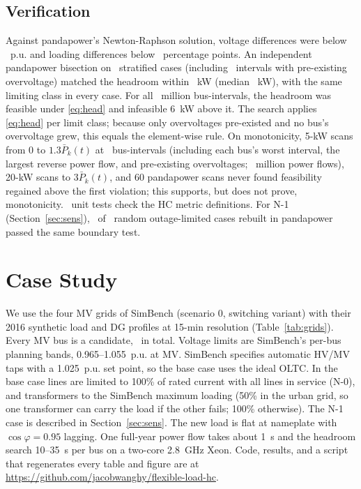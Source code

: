 \documentclass[conference,letterpaper]{IEEEtran}
\begin{document}
\subsection{Verification}\label{sec:val}
Against pandapower's Newton-Raphson solution, voltage differences were below \maxdV~p.u. and loading differences below \maxdL~percentage points. An independent pandapower bisection on \audValN~stratified cases (including \audValOvt~intervals with pre-existing overvoltage) matched the headroom within \audValMax~kW (median \audValMed~kW), with the same limiting class in every case. For all \audBoundaryM~million bus-intervals, the headroom was feasible under \eqref{eq:head} and infeasible 6~kW above it. The search applies \eqref{eq:head} per limit class; because only overvoltages pre-existed and no bus's overvoltage grew, this equals the element-wise rule. On monotonicity, 5-kW scans from 0 to $1.3\bar P_k(t)$ at \fsCases~bus-intervals (including each bus's worst interval, the largest reverse power flow, and pre-existing overvoltages; \fsSteps~million power flows), 20-kW scans to $3\bar P_k(t)$, and 60 pandapower scans never found feasibility regained above the first violation; this supports, but does not prove, monotonicity. \audTestsN~unit tests check the HC metric definitions. For N-1 (Section~\ref{sec:sens}), \nOnePPOK~of \nOnePPN~random outage-limited cases rebuilt in pandapower passed the same boundary test.

\section{Case Study}
We use the four MV grids of SimBench \cite{simbench} (scenario 0, switching variant) with their 2016 synthetic load and DG profiles at 15-min resolution (Table~\ref{tab:grids}). Every MV bus is a candidate, \nBus~in total. Voltage limits are SimBench's per-bus planning bands, 0.965--1.055~p.u. at MV. SimBench specifies automatic HV/MV taps with a 1.025~p.u. set point, so the base case uses the ideal OLTC. In the base case lines are limited to 100\% of rated current with all lines in service (N-0), and transformers to the SimBench maximum loading (50\% in the urban grid, so one transformer can carry the load if the other fails; 100\% otherwise). The N-1 case is described in Section~\ref{sec:sens}. The new load is flat at nameplate with $\cos\varphi=0.95$ lagging. One full-year power flow takes about 1~s and the headroom search 10--35~s per bus on a two-core 2.8~GHz Xeon. Code, results, and a script that regenerates every table and figure are at \url{https://github.com/jacobwanghy/flexible-load-hc}.
\end{document}
